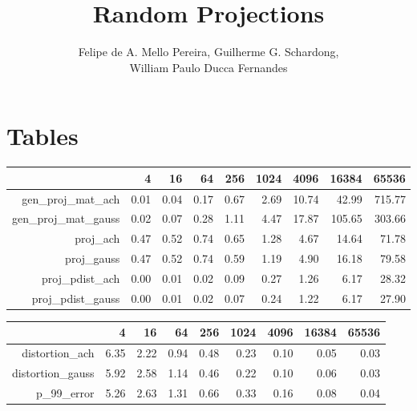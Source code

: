 \documentclass[]{article}
\title{Random Projections}
\author{Felipe de A. Mello Pereira, Guilherme G. Schardong, \\ William Paulo Ducca Fernandes}
\begin{document}
\maketitle

\begin{abstract}

\end{abstract}

\section{Tables}

\begin{table}[ht]
	\centering
	\begin{tabular}{rrrrrrrrr}
		\hline
		& 4 & 16 & 64 & 256 & 1024 & 4096 & 16384 & 65536 \\ 
		\hline
		gen\_proj\_mat\_ach & 0.01 & 0.04 & 0.17 & 0.67 & 2.69 & 10.74 & 42.99 & 715.77 \\ 
		gen\_proj\_mat\_gauss & 0.02 & 0.07 & 0.28 & 1.11 & 4.47 & 17.87 & 105.65 & 303.66 \\ 
		proj\_ach & 0.47 & 0.52 & 0.74 & 0.65 & 1.28 & 4.67 & 14.64 & 71.78 \\ 
		proj\_gauss & 0.47 & 0.52 & 0.74 & 0.59 & 1.19 & 4.90 & 16.18 & 79.58 \\ 
		proj\_pdist\_ach & 0.00 & 0.01 & 0.02 & 0.09 & 0.27 & 1.26 & 6.17 & 28.32 \\ 
		proj\_pdist\_gauss & 0.00 & 0.01 & 0.02 & 0.07 & 0.24 & 1.22 & 6.17 & 27.90 \\ 
		\hline
	\end{tabular}
\end{table}

\begin{table}[ht]
	\centering
	\begin{tabular}{rrrrrrrrr}
		\hline
		& 4 & 16 & 64 & 256 & 1024 & 4096 & 16384 & 65536 \\ 
		\hline
		distortion\_ach & 6.35 & 2.22 & 0.94 & 0.48 & 0.23 & 0.10 & 0.05 & 0.03 \\ 
		distortion\_gauss & 5.92 & 2.58 & 1.14 & 0.46 & 0.22 & 0.10 & 0.06 & 0.03 \\ 
		p\_99\_error & 5.26 & 2.63 & 1.31 & 0.66 & 0.33 & 0.16 & 0.08 & 0.04 \\ 
		\hline
	\end{tabular}
\end{table}
\end{document}
